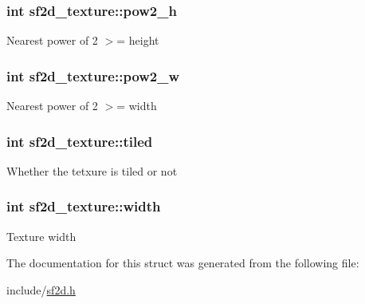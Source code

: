 \subsubsection[{pow2\+\_\+h}]{\setlength{\rightskip}{0pt plus 5cm}int sf2d\+\_\+texture\+::pow2\+\_\+h}\label{structsf2d__texture_a644c43b5fde6e12c8f1e3cb0280798e1}
Nearest power of 2 $>$= height \hypertarget{structsf2d__texture_aa1c5388828ad6d18ea37eb2e6ace7f48}{}
\subsubsection[{pow2\+\_\+w}]{\setlength{\rightskip}{0pt plus 5cm}int sf2d\+\_\+texture\+::pow2\+\_\+w}\label{structsf2d__texture_aa1c5388828ad6d18ea37eb2e6ace7f48}
Nearest power of 2 $>$= width \hypertarget{structsf2d__texture_a4a66a4712612cc5e3f5cdff7d0e604ec}{}
\subsubsection[{tiled}]{\setlength{\rightskip}{0pt plus 5cm}int sf2d\+\_\+texture\+::tiled}\label{structsf2d__texture_a4a66a4712612cc5e3f5cdff7d0e604ec}
Whether the tetxure is tiled or not \hypertarget{structsf2d__texture_a312abd0ee8ab587825804132c136b253}{}
\subsubsection[{width}]{\setlength{\rightskip}{0pt plus 5cm}int sf2d\+\_\+texture\+::width}\label{structsf2d__texture_a312abd0ee8ab587825804132c136b253}
Texture width 

The documentation for this struct was generated from the following file\+:\begin{DoxyCompactItemize}
\item 
include/\hyperlink{sf2d_8h}{sf2d.\+h}\end{DoxyCompactItemize}
